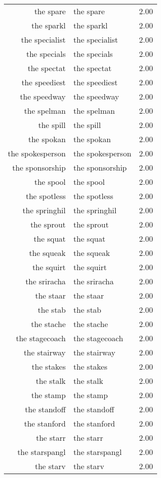 \begin{table}[ht]
\begin{tabular}{rlr}
  the spare & the spare & 2.00 \\ 
  the sparkl & the sparkl & 2.00 \\ 
  the specialist & the specialist & 2.00 \\ 
  the specials & the specials & 2.00 \\ 
  the spectat & the spectat & 2.00 \\ 
  the speediest & the speediest & 2.00 \\ 
  the speedway & the speedway & 2.00 \\ 
  the spelman & the spelman & 2.00 \\ 
  the spill & the spill & 2.00 \\ 
  the spokan & the spokan & 2.00 \\ 
  the spokesperson & the spokesperson & 2.00 \\ 
  the sponsorship & the sponsorship & 2.00 \\ 
  the spool & the spool & 2.00 \\ 
  the spotless & the spotless & 2.00 \\ 
  the springhil & the springhil & 2.00 \\ 
  the sprout & the sprout & 2.00 \\ 
  the squat & the squat & 2.00 \\ 
  the squeak & the squeak & 2.00 \\ 
  the squirt & the squirt & 2.00 \\ 
  the sriracha & the sriracha & 2.00 \\ 
  the staar & the staar & 2.00 \\ 
  the stab & the stab & 2.00 \\ 
  the stache & the stache & 2.00 \\ 
  the stagecoach & the stagecoach & 2.00 \\ 
  the stairway & the stairway & 2.00 \\ 
  the stakes & the stakes & 2.00 \\ 
  the stalk & the stalk & 2.00 \\ 
  the stamp & the stamp & 2.00 \\ 
  the standoff & the standoff & 2.00 \\ 
  the stanford & the stanford & 2.00 \\ 
  the starr & the starr & 2.00 \\ 
  the starspangl & the starspangl & 2.00 \\ 
  the starv & the starv & 2.00 \\ 

\end{tabular}
\end{table}
